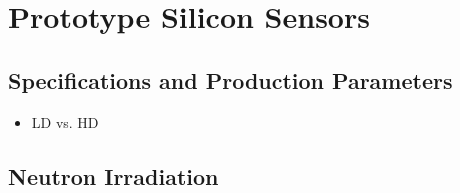 \section{Prototype Silicon Sensors}
\label{sec:sensors}

\subsection{Specifications and Production Parameters}
\label{subsec:sensors_specifications}

\begin{itemize}
    \item LD vs. HD
\end{itemize}

\subsection{Neutron Irradiation}
\label{subsec:sensors_irradiation}